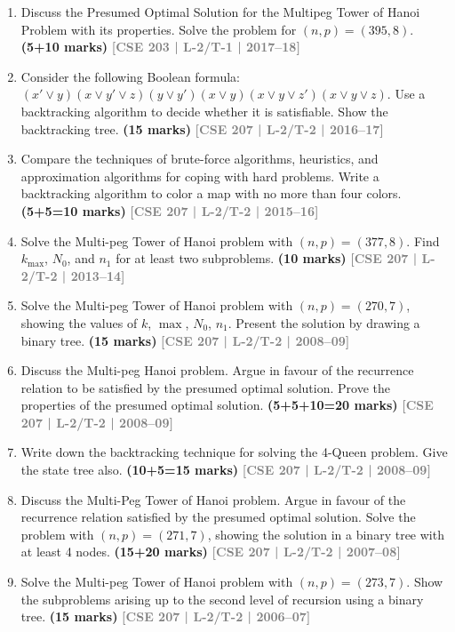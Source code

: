 \documentclass[12pt]{article}
\newcommand{\yr}[1]{\hfill\textcolor{gray}{\small\textbf{[#1]}}}
\newcommand{\mk}[1]{\textcolor{orange!70!black}{\small\textbf{(#1 marks)}}}
\begin{document}
\begin{enumerate}
\begin{center}
\end{center}


\item Discuss the Presumed Optimal Solution for the Multipeg Tower of Hanoi Problem with its properties. Solve the problem for $(n, p) = (395, 8)$. \mk{5+10}
\yr{CSE 203 | L-2/T-1 | 2017--18}


\item Consider the following Boolean formula: $(x' \vee y)(x \vee y' \vee z)(y \vee y')(x \vee y)(x \vee y \vee z')(x \vee y \vee z)$. Use a backtracking algorithm to decide whether it is satisfiable. Show the backtracking tree. \mk{15}
\yr{CSE 207 | L-2/T-2 | 2016--17}



\item Compare the techniques of brute-force algorithms, heuristics, and approximation algorithms for coping with hard problems. Write a backtracking algorithm to color a map with no more than four colors. \mk{5+5=10}
\yr{CSE 207 | L-2/T-2 | 2015--16}


\item Solve the Multi-peg Tower of Hanoi problem with $(n, p) = (377, 8)$. Find $k_{\max}$, $N_0$, and $n_1$ for at least two subproblems. \mk{10}
\yr{CSE 207 | L-2/T-2 | 2013--14}

\item Solve the Multi-peg Tower of Hanoi problem with $(n, p) = (270, 7)$, showing the values of $k$, $\max$, $N_0$, $n_1$. Present the solution by drawing a binary tree. \mk{15}
\yr{CSE 207 | L-2/T-2 | 2008--09}


\item Discuss the Multi-peg Hanoi problem. Argue in favour of the recurrence relation to be satisfied by the presumed optimal solution. Prove the properties of the presumed optimal solution. \mk{5+5+10=20}
\yr{CSE 207 | L-2/T-2 | 2008--09}

\item Write down the backtracking technique for solving the 4-Queen problem. Give the state tree also. \mk{10+5=15}
\yr{CSE 207 | L-2/T-2 | 2008--09}


\item Discuss the Multi-Peg Tower of Hanoi problem. Argue in favour of the recurrence relation satisfied by the presumed optimal solution. Solve the problem with $(n, p) = (271, 7)$, showing the solution in a binary tree with at least 4 nodes. \mk{15+20}
\yr{CSE 207 | L-2/T-2 | 2007--08}


\item Solve the Multi-peg Tower of Hanoi problem with $(n, p) = (273, 7)$. Show the subproblems arising up to the second level of recursion using a binary tree. \mk{15}
\yr{CSE 207 | L-2/T-2 | 2006--07}


\end{enumerate}
\end{document}
